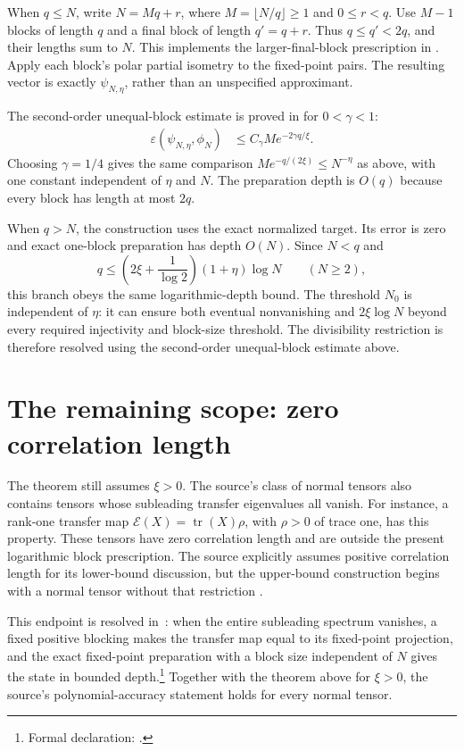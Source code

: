 \documentclass{article}
\begin{document}
When $q\leq N$, write $N=Mq+r$, where $M=\lfloor N/q\rfloor\geq1$
and $0\leq r<q$. Use $M-1$ blocks of length $q$ and a final block of
length $q'=q+r$. Thus $q\leq q'<2q$, and their lengths sum to $N$.
This implements the larger-final-block prescription in
\cite[Supplemental Material, p.~9, proof of Theorem~1, following
 eq.~(S23)]{Malz2024Preparation}. Apply each block's polar partial
isometry to the fixed-point pairs. The resulting vector is exactly
$\psi_{N,\eta}$, rather than an unspecified approximant.

The second-order unequal-block estimate is proved in
 for $0<\gamma<1$:
\begin{align}
    \varepsilon(\psi_{N,\eta},\phi_N)
     & \leq C_\gamma M e^{-2\gamma q/\xi}.
    \label{eq:mswc24_polynomial_variable_error}
\end{align}
Choosing $\gamma=1/4$ gives the same comparison
$M e^{-q/(2\xi)}\leq N^{-\eta}$ as above, with one constant independent
of $\eta$ and $N$. The preparation depth is $O(q)$ because every block
has length at most $2q$.

When $q>N$, the construction uses the exact normalized target. Its error
is zero and exact one-block preparation has depth $O(N)$. Since $N<q$
and
\begin{equation*}
    q\leq \left(2\xi+\frac1{\log2}\right)(1+\eta)\log N
       \qquad(N\geq2),
\end{equation*}
this branch obeys the same logarithmic-depth bound. The threshold $N_0$
is independent of $\eta$: it can ensure both eventual nonvanishing and
$2\xi\log N$ beyond every required injectivity and block-size threshold.
The divisibility restriction is therefore resolved using the second-order
unequal-block estimate above.

\section{The remaining scope: zero correlation length}
The theorem still assumes $\xi>0$. The source's class of normal tensors
also contains tensors whose subleading transfer eigenvalues all vanish.
For instance, a rank-one transfer map
$\mathcal{E}(X)=\operatorname{tr}(X)\rho$, with $\rho>0$ of trace one, has this
property. These tensors have zero correlation length and are outside
the present logarithmic block prescription. The source explicitly
assumes positive correlation length for its lower-bound discussion,
but the upper-bound construction begins with a normal tensor without
that restriction \cite[pp.~2--3]{Malz2024Preparation}.

This endpoint is resolved in~\cite{gap:mswc24_zero_subleading_spectrum_endpoint}:
when the entire subleading spectrum vanishes, a fixed positive blocking makes the
transfer map equal to its fixed-point projection, and the exact fixed-point
preparation with a block size independent of $N$ gives the state in bounded
depth.\footnote{Formal declaration:
    .}
Together with the theorem above for $\xi>0$, the source's polynomial-accuracy
statement holds for every normal tensor.



\end{document}
